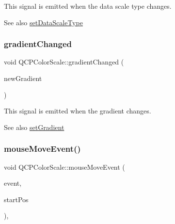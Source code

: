 This signal is emitted when the data scale type changes.

\begin{DoxySeeAlso}{See also}
\mbox{\hyperlink{class_q_c_p_color_scale_aeb6107d67dd7325145b2498abae67fc3}{set\+Data\+Scale\+Type}} 
\end{DoxySeeAlso}
\mbox{\label{class_q_c_p_color_scale_a5e5f8c5626242c8f7308bfab74d3d989}} 
\subsubsection{\texorpdfstring{gradient\+Changed}{gradientChanged}}
{\footnotesize\ttfamily void Q\+C\+P\+Color\+Scale\+::gradient\+Changed (\begin{DoxyParamCaption}\item[{const \mbox{\hyperlink{class_q_c_p_color_gradient}{Q\+C\+P\+Color\+Gradient}} \&}]{new\+Gradient }\end{DoxyParamCaption})\hspace{0.3cm}{\ttfamily [signal]}}

This signal is emitted when the gradient changes.

\begin{DoxySeeAlso}{See also}
\mbox{\hyperlink{class_q_c_p_color_scale_a1f29583bb6f1e7f473b62fb712be3940}{set\+Gradient}} 
\end{DoxySeeAlso}
\mbox{\label{class_q_c_p_color_scale_a3b2bd79725aefaf2630fc76e90939442}} 
\subsubsection{\texorpdfstring{mouse\+Move\+Event()}{mouseMoveEvent()}}
{\footnotesize\ttfamily void Q\+C\+P\+Color\+Scale\+::mouse\+Move\+Event (\begin{DoxyParamCaption}\item[{Q\+Mouse\+Event $\ast$}]{event,  }\item[{const Q\+PointF \&}]{start\+Pos }\end{DoxyParamCaption})\hspace{0.3cm}{\ttfamily [protected]}, {\ttfamily [virtual]}}

